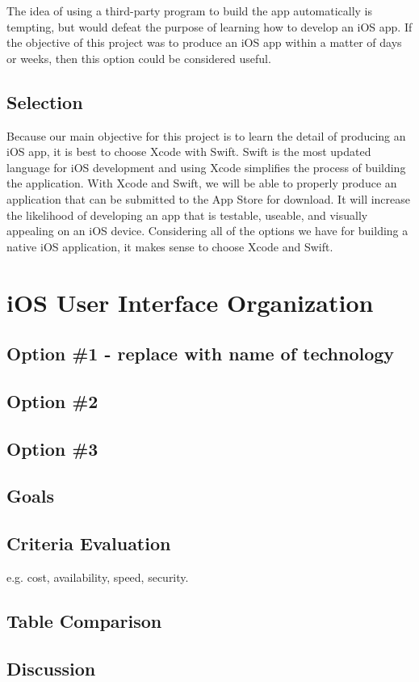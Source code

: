 \documentclass[letterpaper,10pt,draftclsnofoot,onecolumn,titlepage]{IEEEtran}
\begin{document}
	The idea of using a third-party program to build the app automatically is tempting, but would defeat the purpose of learning how to develop an iOS app. 
	If the objective of this project was to produce an iOS app within a matter of days or weeks, then this option could be considered useful. 
	\subsection{Selection}
	Because our main objective for this project is to learn the detail of producing an iOS app, it is best to choose Xcode with Swift. 
	Swift is the most updated language for iOS development and using Xcode simplifies the process of building the application. 
	With Xcode and Swift, we will be able to properly produce an application that can be submitted to the App Store for download. 
	It will increase the likelihood of developing an app that is testable, useable, and visually appealing on an iOS device. 
	Considering all of the options we have for building a native iOS application, it makes sense to choose Xcode and Swift. 
	
	\section{iOS User Interface Organization}
	\subsection{Option \#1 - replace with name of technology}
	\subsection{Option \#2}
	\subsection{Option \#3}
	\subsection{Goals}
	\subsection{Criteria Evaluation}
	e.g. cost, availability, speed, security.
	\subsection{Table Comparison}
	\subsection{Discussion}
\end{document}
